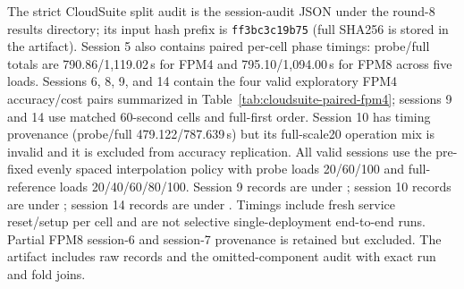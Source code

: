 \documentclass[sigconf, review, anonymous, balance=false]{acmart}
\begin{document}
The strict CloudSuite split audit is the session-audit JSON under the round-8 results directory; its input hash prefix is \texttt{ff3bc3c19b75} (full SHA256 is stored in the artifact). Session 5 also contains paired per-cell phase timings: probe/full totals are 790.86/1,119.02\,s for FPM4 and 795.10/1,094.00\,s for FPM8 across five loads. Sessions 6, 8, 9, and 14 contain the four valid exploratory FPM4 accuracy/cost pairs summarized in Table~\ref{tab:cloudsuite-paired-fpm4}; sessions 9 and 14 use matched 60-second cells and full-first order. Session 10 has timing provenance (probe/full 479.122/787.639\,s) but its full-scale20 operation mix is invalid and it is excluded from accuracy replication. All valid sessions use the pre-fixed evenly spaced interpolation policy with probe loads 20/60/100 and full-reference loads 20/40/60/80/100. Session 9 records are under ; session 10 records are under ; session 14 records are under . Timings include fresh service reset/setup per cell and are not selective single-deployment end-to-end runs. Partial FPM8 session-6 and session-7 provenance is retained but excluded. The artifact includes raw records and the omitted-component audit with exact run and fold joins.
\end{document}
